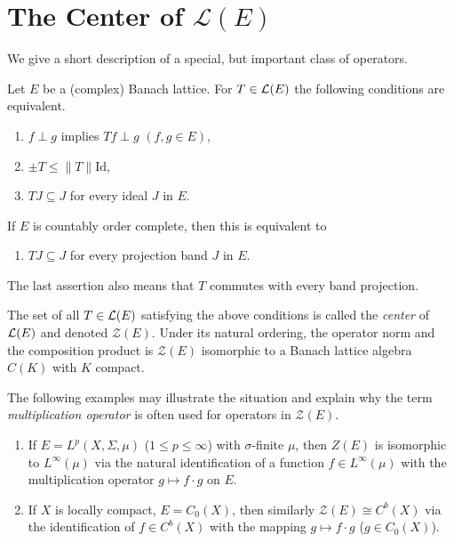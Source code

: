 \section{The Center of 
\texorpdfstring{$\mathcal{L}(E)$}{L(E)}}\label{sec:c1-9}
%
We give a short description of a special, but important class of operators.

Let $ E $ be a (complex) Banach lattice.
For $ T \in \mathcal{L}(E) $ the following conditions are equivalent.
\begin{enumerate}[\upshape (a)]

    \item 
    $ f \perp g $ implies $ Tf \perp g $ \quad $(f, g \in E)$,
    
    \item 
    $ \pm T \leq \|T\|\text{Id}$,
    
    \item 
    $ TJ \subseteq J $ for every ideal $ J $ in $ E $.
    
\end{enumerate}
If $ E $ is countably order complete, then this is equivalent to
\begin{enumerate}
    \item 
    $ TJ \subseteq J $ for every projection band $ J $ in $ E $.
\end{enumerate}
The last assertion also means that $ T $ commutes with every band projection.

The set of all $ T \in \mathcal{L}(E) $ satisfying the above conditions is called the \emph{center} of $ \mathcal{L}(E) $ and denoted 
$ \mathcal{Z}(E) $.
Under its natural ordering, the operator norm and the composition product is $ \mathcal{Z}(E) $ isomorphic to a Banach lattice algebra $ C(K) $ with $ K $ compact.

The following examples may illustrate the situation and explain why the term \emph{multiplication operator} is often used for operators in $ \mathcal{Z}(E) $.
\begin{enumerate}[\upshape (i), wide, labelindent=.5em]
\item 
If $ E = L^{p}(X,\Sigma,\mu) $ ($ 1 \leq p \leq \infty $) with $ \sigma $-finite $ \mu $, then $ Z(E) $ is isomorphic to $ L^{\infty}(\mu) $ via the natural identification of a function $ f \in L^{\infty}(\mu) $ with the multiplication operator $ g \mapsto f\cdot g $ on $ E $. 

\item 
If $ X $ is locally compact, $ E = C_{0}(X) $, then similarly $ \mathcal{Z}(E) \cong C^{b}(X) $ via the identification of $ f \in C^{b}(X) $ with the mapping $ g \mapsto f\cdot g $ ($ g \in C_{0}(X) $).
\end{enumerate}

